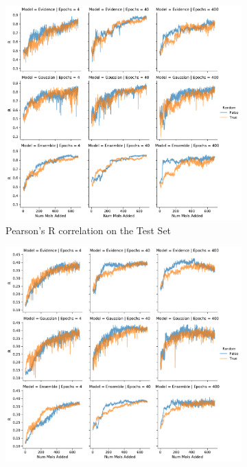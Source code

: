 \documentclass[journal=jmcmar,manuscript=article]{achemso}
\begin{document}
\begin{figure}[tbph]
    \centering
    \begin{subfigure}[b]{0.48\textwidth}
        \includegraphics[width=1\linewidth]{figures/fig8_morgan_fp_bigmodel_R.pdf}
        \caption{Pearson's R correlation on the Test Set}
    \end{subfigure}%
    \hfill
    \begin{subfigure}[b]{0.48\textwidth}
        \includegraphics[width=1\linewidth]{figures/fig8_morgan_fp_bigmodel_rest_R.pdf}

\end{subfigure}
\end{figure}
\end{document}
